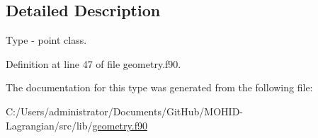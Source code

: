 \subsection{Detailed Description}
Type -\/ point class. 

Definition at line 47 of file geometry.\+f90.



The documentation for this type was generated from the following file\+:\begin{DoxyCompactItemize}
\item 
C\+:/\+Users/administrator/\+Documents/\+Git\+Hub/\+M\+O\+H\+I\+D-\/\+Lagrangian/src/lib/\mbox{\hyperlink{geometry_8f90}{geometry.\+f90}}\end{DoxyCompactItemize}
